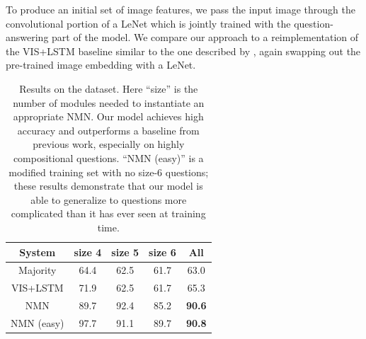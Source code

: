 


To produce an initial set of image features, we pass the input image through the
convolutional portion of a LeNet \cite{LeCun90LeNet} which is jointly trained
with the question-answering part of the model. We compare our approach to a
reimplementation of the VIS+LSTM baseline similar to the one described by
\cite{Ren15VQA}, again swapping out the pre-trained image embedding with a
LeNet.

\begin{table}
  \footnotesize
  \centering
  \begin{tabular}{ccccc}
    \toprule
    System & size 4 & size 5 & size 6 & All \\
    \midrule
    Majority & 64.4 & 62.5 & 61.7 & 63.0 \\
    VIS+LSTM & 71.9 & 62.5 & 61.7 & 65.3 \\
    NMN      & 89.7 & 92.4 & 85.2 & \bf 90.6 \\
    NMN (easy) & 97.7 & 91.1 & 89.7 & \bf 90.8 \\
    \bottomrule
  \end{tabular}
  \caption{Results on the \shapes dataset. Here ``size'' is the number of
    modules needed to instantiate an appropriate NMN. Our model achieves high
    accuracy and outperforms a baseline from previous work, especially on highly
    compositional questions. ``NMN (easy)''  is a modified training set with no
    size-6 questions; these results demonstrate that our model is able to
    generalize to questions more complicated than it has ever seen at training
    time.
  }
  \label{tab:shapes-results}
\end{table}


